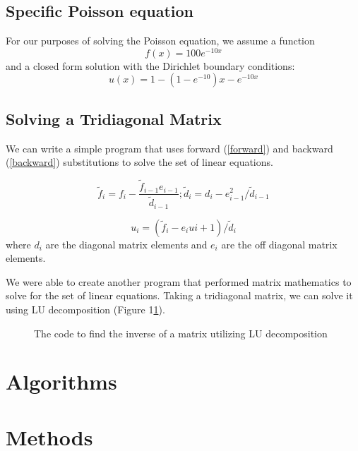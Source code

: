 \documentclass[10pt,showpacs,preprintnumbers,footinbib,amsmath,amssymb,aps,prl,twocolumn,groupedaddress,superscriptaddress,showkeys]{revtex4-1}
\begin{document}
	\subsection{Specific Poisson equation}	
For our purposes of solving the Poisson equation, we assume a function \begin{equation}
	f(x)=100e^{-10x}
	\end{equation}
and a closed form solution with the Dirichlet boundary conditions:
	\begin{equation}
	u(x)=1-(1-e^{-10})x-e^{-10x}
	\end{equation}

	\subsection{Solving a Tridiagonal Matrix}	
We can write a simple program that uses forward (\ref{forward}) and backward (\ref{backward}) substitutions to solve the set of linear equations.
	
	\begin{equation}
	\tilde{f}_{i}=f_{i}-\frac{\tilde{f}_{i-1}e_{i-1}}{\tilde{d}_{i-1}} ; \tilde{d}_{i}=d_{i}-e^{2}_{i-1}/\tilde{d}_{i-1}
	\label{forward}
	\end{equation}
	
	\begin{equation}
	u_{i} = (\tilde{f}_{i}-e_{i}u{i+1})/\tilde{d}_{i}
	\label{backward}
	\end{equation}
where $d_{i}$ are the diagonal matrix elements and $e_{i}$ are the off diagonal matrix elements.
	


We were able to create another program that performed matrix mathematics to solve for the set of linear equations.  Taking a tridiagonal matrix, we can solve it using LU decomposition (Figure 1\ref{ludecomp}).
	
	
	\begin{figure}[!ht]
			\centering
			
			\label{ludecomp}
			\caption{The code to find the inverse of a matrix utilizing LU decomposition}
		\end{figure}

\section{Algorithms}	

\section{Methods}
\end{document}
